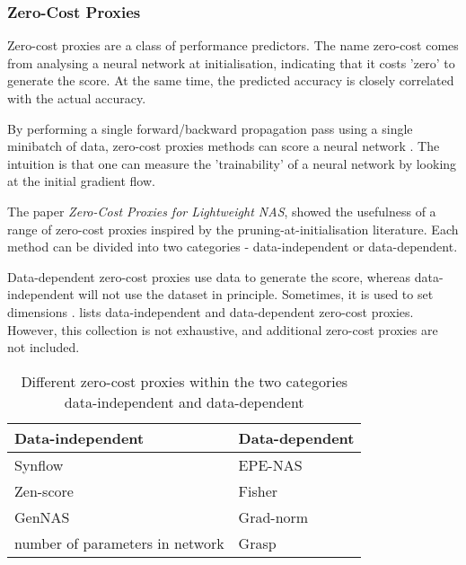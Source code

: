 \subsubsection{Zero-Cost Proxies}\label{subsec:zerocost}
Zero-cost proxies are a class of performance predictors. The name zero-cost comes from analysing a neural network at initialisation, indicating that it costs 'zero' to generate the score. At the same time, the predicted accuracy is closely correlated with the actual accuracy. 

By performing a single forward/backward propagation pass using a single minibatch of data, zero-cost proxies methods can score a neural network \autocite{akhauri2022evolving}. The intuition is that one can measure the 'trainability' of a neural network by looking at the initial gradient flow. 

The paper \textit{Zero-Cost Proxies for Lightweight NAS}, \autocite{abdelfattah2021zero} showed the usefulness of a range of zero-cost proxies inspired by the pruning-at-initialisation literature. Each method can be divided into two categories - data-independent or data-dependent. 

Data-dependent zero-cost proxies use data to generate the score, whereas data-independent will not use the dataset in principle. Sometimes, it is used to set dimensions \autocite{colin2022adeeperlook}.  lists data-independent and data-dependent zero-cost proxies. However, this collection is not exhaustive, and additional zero-cost proxies are not included. 


\begin{table}[ht]
    \caption{Different zero-cost proxies within the two categories data-independent and data-dependent}
    \centering
    \begin{tabular}{l|l}
    \textbf{Data-independent}         & \textbf{Data-dependent} \\ \hline
    Synflow & EPE-NAS                   \\
    \cellcolor{verylightgray}Zen-score                       & \cellcolor{verylightgray}Fisher                    \\
    GenNAS                          & Grad-norm                 \\
    \cellcolor{verylightgray}number of parameters in network & \cellcolor{verylightgray}Grasp                                 
    \end{tabular}
    \label{tab:zcproxies}
\end{table}


